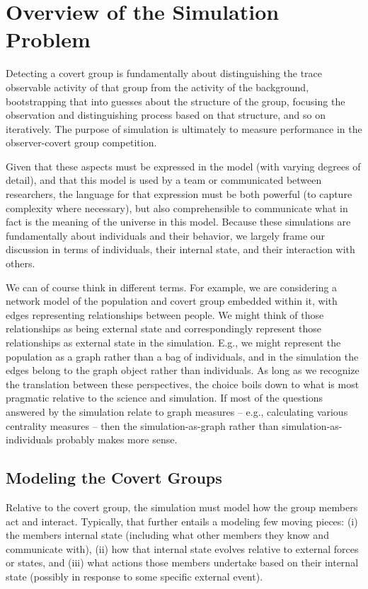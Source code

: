 \documentclass{article}
\begin{document}
\section*{Overview of the Simulation Problem}
Detecting a covert group is fundamentally about distinguishing the trace observable activity of that group from the activity of the background, bootstrapping that into guesses about the structure of the group, focusing the observation and distinguishing process based on that structure, and so on iteratively.  The purpose of simulation is ultimately to measure performance in the observer-covert group competition.

Given that these aspects must be expressed in the model (with varying degrees of detail), and that this model is used by a team or communicated between researchers, the language for that expression must be both powerful (to capture complexity where necessary), but also comprehensible to communicate what in fact is the meaning of the universe in this model.  Because these simulations are fundamentally about individuals and their behavior, we largely frame our discussion in terms of individuals, their internal state, and their interaction with others.

We can of course think in different terms.  For example, we are considering a network model of the population and covert group embedded within it, with edges representing relationships between people.  We might think of those relationships as being external state and correspondingly represent those relationships as external state in the simulation.  E.g., we might represent the population as a graph rather than a bag of individuals, and in the simulation the edges belong to the graph object rather than individuals.  As long as we recognize the translation between these perspectives, the choice boils down to what is most pragmatic relative to the science and simulation.  If most of the questions answered by the simulation relate to graph measures -- e.g., calculating various centrality measures -- then the simulation-as-graph rather than simulation-as-individuals probably makes more sense.

\subsection*{Modeling the Covert Groups}
Relative to the covert group, the simulation must model how the group members act and interact.  Typically, that further entails a modeling few moving pieces: (i) the members internal state (including what other members they know and communicate with), (ii) how that internal state evolves relative to external forces or states, and (iii) what actions those members undertake based on their internal state (possibly in response to some specific external event).
\end{document}
